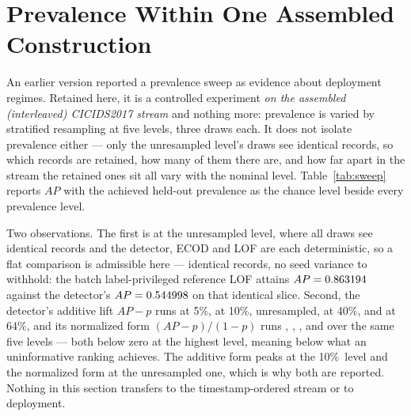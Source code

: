 \documentclass[manuscript,anonymous,review]{acmart}
\begin{document}
\section{Prevalence Within One Assembled Construction}
\label{sec:sweep}

An earlier version reported a prevalence sweep as evidence about deployment
regimes. Retained here, it is a controlled experiment \emph{on the assembled
(interleaved) CICIDS2017 stream} and nothing more: prevalence is varied by
stratified resampling at five levels, three draws each. It does not isolate
prevalence either --- only the unresampled level's draws see identical records,
so which records are retained, how many of them there are, and how far apart in
the stream the retained ones sit all vary with the nominal level. Table~\ref{tab:sweep} reports $AP$ with the achieved held-out prevalence
as the chance level beside every prevalence level.

\begin{table}
\caption{AUC-PR by prevalence level on the assembled construction (mean over
three resampling draws). ``Chance level'' is the achieved held-out prevalence.
At the unresampled level all draws see the same records; at resampled levels
the three draws of every method differ by the resampling draw. Per-draw values
and normalized lift are in the archived findings.}
\label{tab:sweep}

\end{table}

Two observations. The first is at the unresampled level, where all draws see
identical records and the detector, ECOD and LOF are each deterministic, so a
flat comparison is admissible here --- identical records, no seed variance to
withhold: the batch label-privileged reference LOF
attains $AP=0.863194$ against the detector's
$AP=0.544998$ on that identical slice.
Second, the detector's additive lift $AP-p$ runs \STwoLFiveProposedLift{} at
5\%, \STwoLTenProposedLift{} at 10\%, \STwoLUnresampledProposedLift{}
unresampled, \STwoLFortyProposedLift{} at 40\%, and
\STwoLSixtyFourProposedLift{} at 64\%, and its normalized form
$(AP-p)/(1-p)$ runs \STwoLFiveProposedNormLift, \STwoLTenProposedNormLift,
\STwoLUnresampledProposedNormLift, \STwoLFortyProposedNormLift{} and
\STwoLSixtyFourProposedNormLift{} over the same five levels --- both below zero
at the highest level, meaning below what an uninformative ranking achieves. The
additive form peaks at the 10\%\ level and the normalized form at the
unresampled one, which is why both are reported. Nothing in this section transfers to the timestamp-ordered stream or
to deployment.
\end{document}
